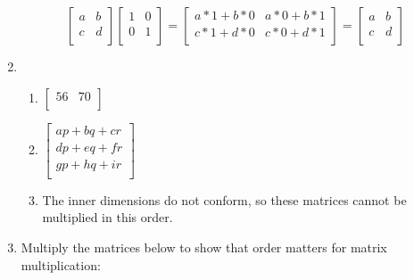 \documentclass[11pt]{article}
\begin{document}
\begin{enumerate}
\[
\left[\begin{array}{cc}
a & b \\
c & d \\
\end{array}\right]
\left[\begin{array}{cc}
1 & 0 \\
0 & 1 \\
\end{array}\right]
=
\left[\begin{array}{cc}
a*1 + b*0 & a*0 + b*1 \\
c*1 + d*0 & c*0 + d*1 \\
\end{array}\right]
=
\left[\begin{array}{cc}
a & b \\
c & d \\
\end{array}\right]
\]


\item 
\begin{enumerate}
\item $\left[\begin{array}{cc}
56 & 70 \\
\end{array}\right]$
\item $
\left[\begin{array}{c}
ap + bq + cr \\
dp + eq + fr \\
gp + hq + ir \\
\end{array}\right]$
\item The inner dimensions do not conform, so these matrices cannot be multiplied in this order.
\end{enumerate}




\item Multiply the matrices below to show that order matters for matrix multiplication: \\


\end{enumerate}
\end{document}
